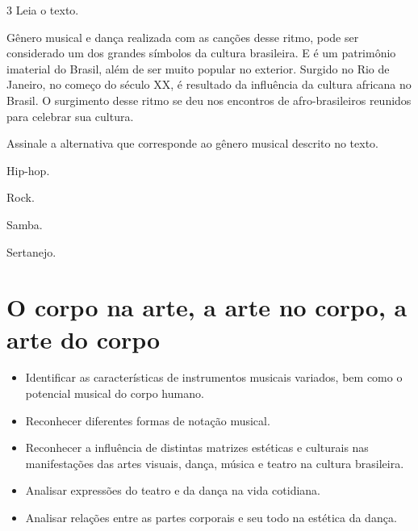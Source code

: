 \num{3}  Leia o texto.

Gênero musical e dança realizada com as canções desse ritmo, pode ser considerado um dos
grandes símbolos da cultura brasileira. E é um patrimônio imaterial do Brasil, além de
ser muito popular no exterior. Surgido no Rio de Janeiro, no começo do século XX, é
resultado da influência da cultura africana no Brasil. O surgimento desse ritmo se deu
nos encontros de afro-brasileiros reunidos para celebrar sua cultura.

Assinale a alternativa que corresponde ao gênero musical descrito no texto.

\begin{minipage}{.5\textwidth}
\begin{escolha}
\item
  Hip-hop.
\item
  Rock.
\item
  Samba.
\item
  Sertanejo.
\end{escolha}
\end{minipage}

\chapter{O corpo na arte, a arte no corpo, a arte do corpo}



\begin{itemize}
\item Identificar as características de instrumentos musicais variados, bem
como o potencial musical do corpo humano.

\item Reconhecer diferentes formas de notação musical.

\item Reconhecer a influência de distintas matrizes estéticas e culturais
nas manifestações das artes visuais, dança, música e teatro na cultura
brasileira.

\item Analisar expressões do teatro e da dança na vida cotidiana.

\item Analisar relações entre as partes corporais e seu todo na estética da dança.
\end{itemize}

